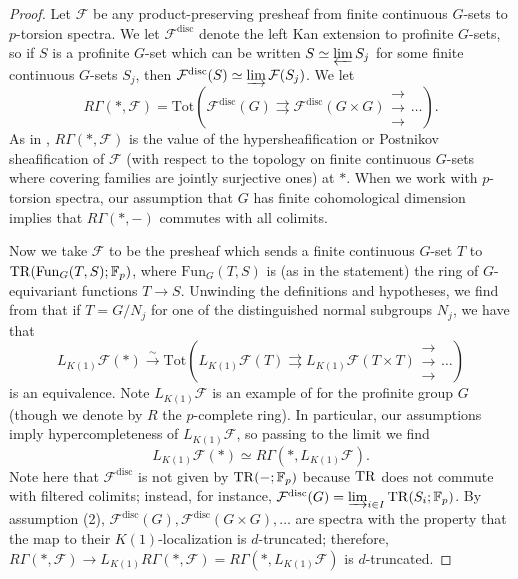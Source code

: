 \documentclass{amsart}
\newcommand{\triplearrows}{\begin{smallmatrix} \to \\ \to \\ 
\to \end{smallmatrix} }
\newcommand{\sF}{\mathcal{F}}
\theoremstyle{definition}
\begin{document}
\begin{proof} 

Let $\sF$ be any product-preserving presheaf from finite continuous $G$-sets 
to $p$-torsion spectra. 
We let $\sF^{\mathrm{disc}}$ denote the left Kan extension to 
profinite $G$-sets, so 
if $S$ is a profinite $G$-set which can be written $S \simeq \varprojlim S_j$
for some finite continuous $G$-sets $S_j$, 
then
$\sF^{\mathrm{disc}}(S) \simeq 
\varinjlim \sF(S_j)$. 
We let 
\[ R \Gamma( \ast, \sF) = \mathrm{Tot}( 
\sF^{\mathrm{disc}}(G) \rightrightarrows \sF^{\mathrm{disc}}(G \times G) \triplearrows
\dots ) . \]
As in \cite[Sec.~4.1]{CM19}, $R \Gamma( \ast, \sF)$ is the 
value of the hypersheafification or Postnikov sheafification of $\sF$ (with respect to the topology on
finite continuous $G$-sets where covering families are jointly
surjective ones) at $\ast$. 
When we work with $p$-torsion spectra, our assumption that $G$ 
has finite cohomological dimension implies that $R \Gamma(\ast, -)$ commutes
with all colimits. 

Now we take $\sF$ to  be the presheaf 
which sends 
a finite continuous $G$-set $T$ to $\mathrm{TR}( \mathrm{Fun}_G(T, S); \mathbb{F}_p)$, where
$\mathrm{Fun}_G(T, S)$ is (as in the statement) the ring of $G$-equivariant functions $T \to S$.  Unwinding the definitions and hypotheses, we find 
from 
that if $T = G/N_j$ for one of
the distinguished normal subgroups $N_j$, we have that
\[ L_{K(1)}\sF(\ast)  \xrightarrow{\sim} \mathrm{Tot}( L_{K(1)}\sF(T) \rightrightarrows
L_{K(1)}\sF(T \times T)
\triplearrows \dots )  \]
is an equivalence. 
Note $L_{K(1)} \sF$ is an example of 
 for the profinite group $G$ (though we denote by $R$ the
$p$-complete ring). 
In particular, our assumptions imply hypercompleteness of $L_{K(1)} \sF$, 
so passing to the limit
we find 
\begin{equation} \label{LK1Fast} L_{K(1)} \sF(\ast)  
\simeq R \Gamma( \ast, L_{K(1)}\sF)
. \end{equation}
Note here that $\sF^{\mathrm{disc}}$ is not given by $\mathrm{TR}(-; \mathbb{F}_p)$ because $\mathrm{TR}$ does
not commute with filtered colimits; 
instead, for instance, $\sF^{\mathrm{disc}}( G) = \varinjlim_{i \in I} \TR(S_i;
\mathbb{F}_p)$. 
By assumption (2), $\sF^{\mathrm{disc}}(G), 
\sF^{\mathrm{disc}}(G \times G) , \dots $ are spectra with the property that the map to
their $K(1)$-localization is $d$-truncated; therefore, 
$R \Gamma(\ast, \sF) \to L_{K(1)}R \Gamma(\ast, \sF)=  R \Gamma(\ast, L_{K(1)} \sF)$ is
$d$-truncated.



\end{proof}
\end{document}
